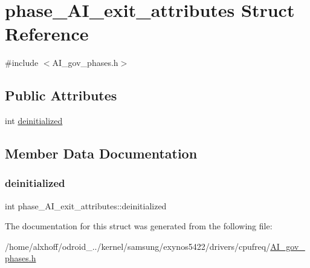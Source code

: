 \hypertarget{structphase__AI__exit__attributes}{}\section{phase\+\_\+\+A\+I\+\_\+exit\+\_\+attributes Struct Reference}
\label{structphase__AI__exit__attributes}


{\ttfamily \#include $<$A\+I\+\_\+gov\+\_\+phases.\+h$>$}

\subsection*{Public Attributes}
\begin{DoxyCompactItemize}
\item 
int \hyperlink{structphase__AI__exit__attributes_ae2237971902155129c78b414269a961d}{deinitialized}
\end{DoxyCompactItemize}


\subsection{Member Data Documentation}
\mbox{\label{structphase__AI__exit__attributes_ae2237971902155129c78b414269a961d}} 
\subsubsection{\texorpdfstring{deinitialized}{deinitialized}}
{\footnotesize\ttfamily int phase\+\_\+\+A\+I\+\_\+exit\+\_\+attributes\+::deinitialized}



The documentation for this struct was generated from the following file\+:\begin{DoxyCompactItemize}
\item 
/home/alxhoff/odroid\+\_../kernel/samsung/exynos5422/drivers/cpufreq/\hyperlink{AI__gov__phases_8h}{A\+I\+\_\+gov\+\_\+phases.\+h}\end{DoxyCompactItemize}
